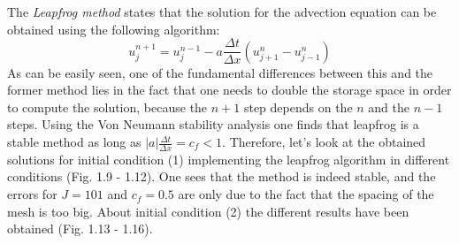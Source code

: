 \documentclass[11pt,a4paper]{article}
\begin{document}
\begin{figure}[!h]
\end{figure}
The \emph{Leapfrog method} states that the solution for the advection equation can be obtained using the following algorithm:
\begin{equation}
u_j^{n+1} = u_j^{n-1} - a\frac{\Delta t}{\Delta x} ( u_{j+1}^n - u_{j-1}^n)
\end{equation}
As can be easily seen, one of the fundamental differences between this and the former method lies in the fact that one needs to double the storage space in order to compute the solution, because the $n+1$ step depends on the $n$ and the $n-1$ steps. Using the Von Neumann stability analysis one finds that leapfrog is a stable method as long as $|a|\frac{\Delta t}{\Delta x} = c_f < 1$. Therefore, let's look at the obtained solutions for initial condition (1) implementing the leapfrog algorithm in different conditions (Fig. 1.9 - 1.12). One sees that the method is indeed stable, and the errors for $J=101$ and $c_f = 0.5$ are only due to the fact that the spacing of the mesh is too big.  About initial condition (2) the different results have been obtained (Fig. 1.13 - 1.16). 
\end{document}
